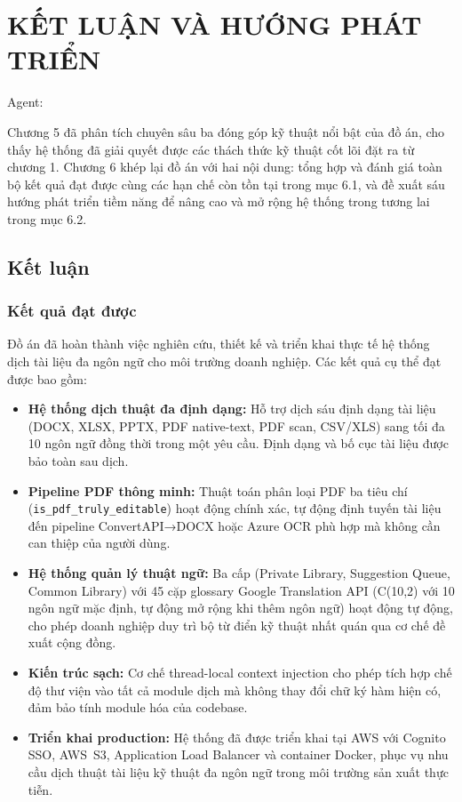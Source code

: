 \chapter{KẾT LUẬN VÀ HƯỚNG PHÁT TRIỂN}

Agent:

Chương 5 đã phân tích chuyên sâu ba đóng góp kỹ thuật nổi bật của đồ án, cho thấy hệ thống đã giải quyết được các thách thức kỹ thuật cốt lõi đặt ra từ chương 1. Chương 6 khép lại đồ án với hai nội dung: tổng hợp và đánh giá toàn bộ kết quả đạt được cùng các hạn chế còn tồn tại trong mục 6.1, và đề xuất sáu hướng phát triển tiềm năng để nâng cao và mở rộng hệ thống trong tương lai trong mục 6.2.

\section{Kết luận}

\subsection{Kết quả đạt được}

Đồ án đã hoàn thành việc nghiên cứu, thiết kế và triển khai thực tế hệ thống dịch tài liệu đa
ngôn ngữ cho môi trường doanh nghiệp. Các kết quả cụ thể đạt được bao gồm:

\begin{itemize}
  \item \textbf{Hệ thống dịch thuật đa định dạng:} Hỗ trợ dịch sáu định dạng tài liệu
    (DOCX, XLSX, PPTX, PDF native-text, PDF scan, CSV/XLS) sang tối đa 10 ngôn ngữ
    đồng thời trong một yêu cầu. Định dạng và bố cục tài liệu được bảo toàn sau dịch.

  \item \textbf{Pipeline PDF thông minh:} Thuật toán phân loại PDF ba tiêu chí
    (\texttt{is\_pdf\_truly\_editable}) hoạt động chính xác, tự động định tuyến tài liệu đến
    pipeline ConvertAPI→DOCX hoặc Azure OCR phù hợp mà không cần can thiệp của người dùng.

  \item \textbf{Hệ thống quản lý thuật ngữ:} Ba cấp (Private Library, Suggestion Queue,
    Common Library) với 45 cặp glossary Google Translation API (C(10,2) với 10 ngôn ngữ
    mặc định, tự động mở rộng khi thêm ngôn ngữ) hoạt động tự động, cho phép doanh nghiệp
    duy trì bộ từ điển kỹ thuật nhất quán qua cơ chế đề xuất cộng đồng.

  \item \textbf{Kiến trúc sạch:} Cơ chế thread-local context injection cho phép tích hợp chế
    độ thư viện vào tất cả module dịch mà không thay đổi chữ ký hàm hiện có, đảm bảo tính
    module hóa của codebase.

  \item \textbf{Triển khai production:} Hệ thống đã được triển khai tại
    AWS với Cognito SSO, AWS~S3, Application Load Balancer và container Docker, phục vụ
    nhu cầu dịch thuật tài liệu kỹ thuật đa ngôn ngữ trong môi trường sản xuất thực tiễn.
\end{itemize}

